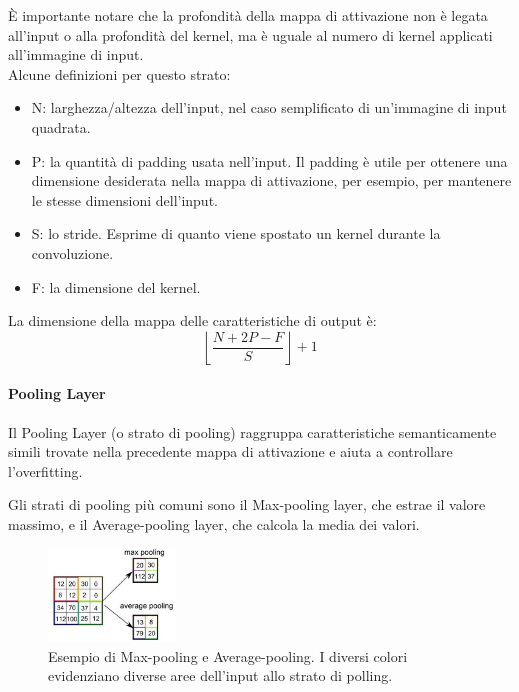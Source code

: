         È importante notare che la profondità della mappa di attivazione non è legata all'input o alla profondità del kernel, ma è uguale al numero di kernel applicati all'immagine di input.\\
        
        Alcune definizioni per questo strato:
            \begin{itemize}
                \item N: larghezza/altezza dell'input, nel caso semplificato di un'immagine di input quadrata.
                \item P: la quantità di padding usata nell'input. Il padding è utile per ottenere una dimensione desiderata nella mappa di attivazione, per esempio, per mantenere le stesse dimensioni dell'input.
                \item S: lo stride. Esprime di quanto viene spostato un kernel durante la convoluzione.
                \item F: la dimensione del kernel.
            \end{itemize}
        
        La dimensione della mappa delle caratteristiche di output è: 
            \begin{equation}
                \left\lfloor\frac{N + 2P - F}{S}\right\rfloor + 1
            \end{equation}

        \paragraph{Pooling Layer}
        Il Pooling Layer (o strato di pooling) raggruppa caratteristiche semanticamente simili trovate nella precedente mappa di attivazione e aiuta a controllare l'overfitting.
        
        Gli strati di pooling più comuni sono il Max-pooling layer, che estrae il valore massimo, e il Average-pooling layer, che calcola la media dei valori.
            \begin{figure}[!h]
                \centering
                \includegraphics[width=0.3\textwidth]{Images/NN/Pooling Layer.jpeg}
                \caption{Esempio di Max-pooling e Average-pooling.
                I diversi colori evidenziano diverse aree dell'input allo strato di polling.}
                \label{Pooling}
            \end{figure}
        
